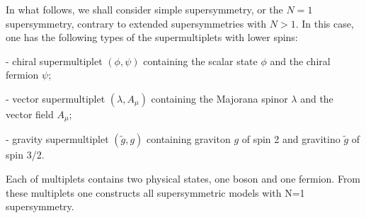 \documentclass{cernyrep}
\begin{document}
In what follows, we shall consider simple supersymmetry, or
the $N=1$ supersymmetry, contrary to extended
supersymmetries with $N > 1$. 
In this case, one has the
following types of the supermultiplets with lower spins:
 
  - chiral supermultiplet   $(\phi,\psi)$ containing the scalar state $\phi$ and the chiral fermion  $\psi$;
  
- vector supermultiplet $(\lambda, A_\mu)$  containing the Majorana spinor $\lambda$   and the vector field $A_\mu$;

- gravity supermultiplet $(\tilde g, g)$ containing graviton $g$ of spin 2 and gravitino $\tilde g$ of spin 3/2. 

Each of multiplets contains two physical states, one boson and one
fermion. From these multiplets one constructs all supersymmetric models with N=1 supersymmetry.
\end{document}
